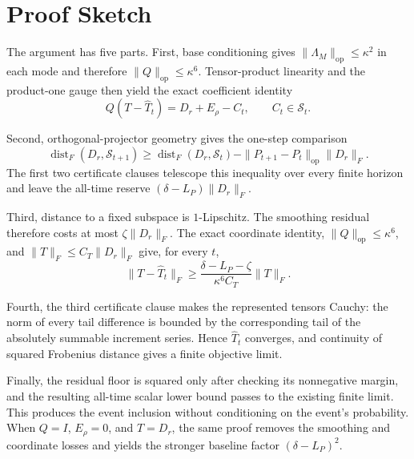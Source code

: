 \section{Proof Sketch}\label{sec:proof-sketch}

The argument has five parts.  First, base conditioning gives
$\|\Lambda_M\|_{\mathrm{op}}\leq\kappa^2$ in each mode and therefore
$\|Q\|_{\mathrm{op}}\leq\kappa^6$.  Tensor-product linearity and the
product-one gauge then yield the exact coefficient identity
\[
Q(T-\widehat T_t)=D_r+E_\rho-C_t,
\qquad C_t\in\mathcal S_t.
\]

Second, orthogonal-projector geometry gives the one-step comparison
\[
\operatorname{dist}_F(D_r,\mathcal S_{t+1})
\geq
\operatorname{dist}_F(D_r,\mathcal S_t)
-\|P_{t+1}-P_t\|_{\mathrm{op}}\|D_r\|_F.
\]
The first two certificate clauses telescope this inequality over every finite
horizon and leave the all-time reserve
$(\delta-L_P)\|D_r\|_F$.

Third, distance to a fixed subspace is $1$-Lipschitz.  The smoothing residual
therefore costs at most $\zeta\|D_r\|_F$.  The exact coordinate identity,
$\|Q\|_{\mathrm{op}}\leq\kappa^6$, and
$\|T\|_F\leq C_T\|D_r\|_F$ give, for every $t$,
\[
\|T-\widehat T_t\|_F
\geq
\frac{\delta-L_P-\zeta}{\kappa^6C_T}\|T\|_F.
\]

Fourth, the third certificate clause makes the represented tensors Cauchy:
the norm of every tail difference is bounded by the corresponding tail of the
absolutely summable increment series.  Hence $\widehat T_t$ converges, and
continuity of squared Frobenius distance gives a finite objective limit.

Finally, the residual floor is squared only after checking its nonnegative
margin, and the resulting all-time scalar lower bound passes to the existing
finite limit.  This produces the event inclusion without conditioning on the
event's probability.  When $Q=I$, $E_\rho=0$, and $T=D_r$, the same proof
removes the smoothing and coordinate losses and yields the stronger baseline
factor $(\delta-L_P)^2$.
